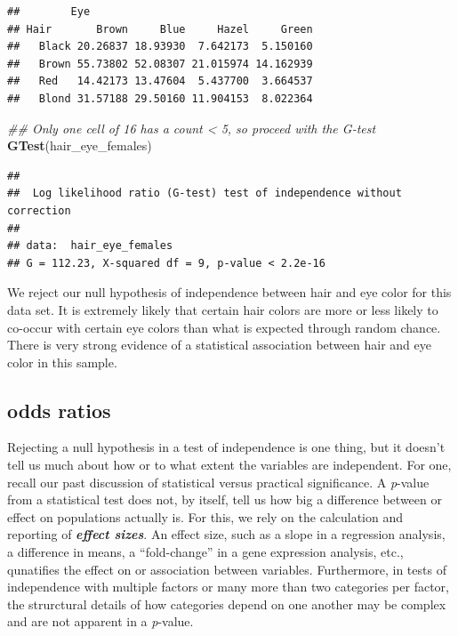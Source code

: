 \documentclass[]{book}
\newenvironment{Shaded}{\begin{snugshade}}{\end{snugshade}}
\newcommand{\CommentTok}[1]{\textcolor[rgb]{0.56,0.35,0.01}{\textit{#1}}}
\newcommand{\KeywordTok}[1]{\textcolor[rgb]{0.13,0.29,0.53}{\textbf{#1}}}
\newcommand{\NormalTok}[1]{#1}
\begin{document}
\begin{verbatim}
##        Eye
## Hair       Brown     Blue     Hazel     Green
##   Black 20.26837 18.93930  7.642173  5.150160
##   Brown 55.73802 52.08307 21.015974 14.162939
##   Red   14.42173 13.47604  5.437700  3.664537
##   Blond 31.57188 29.50160 11.904153  8.022364
\end{verbatim}

\begin{Shaded}
\begin{Highlighting}[]
\CommentTok{## Only one cell of 16 has a count < 5, so proceed with the G-test}
\KeywordTok{GTest}\NormalTok{(hair_eye_females)}
\end{Highlighting}
\end{Shaded}

\begin{verbatim}
## 
##  Log likelihood ratio (G-test) test of independence without correction
## 
## data:  hair_eye_females
## G = 112.23, X-squared df = 9, p-value < 2.2e-16
\end{verbatim}

We reject our null hypothesis of independence between hair and eye color for this data set. It is extremely likely that certain hair colors are more or less likely to co-occur with certain eye colors than what is expected through random chance. There is very strong evidence of a statistical association between hair and eye color in this sample.

\hypertarget{odds-ratios}{%
\subsection{odds ratios}\label{odds-ratios}}

Rejecting a null hypothesis in a test of independence is one thing, but it doesn't tell us much about how or to what extent the variables are independent. For one, recall our past discussion of statistical versus practical significance. A \emph{p}-value from a statistical test does not, by itself, tell us how big a difference between or effect on populations actually is. For this, we rely on the calculation and reporting of \textbf{\emph{effect sizes}}. An effect size, such as a slope in a regression analysis, a difference in means, a ``fold-change'' in a gene expression analysis, etc., qunatifies the effect on or association between variables. Furthermore, in tests of independence with multiple factors or many more than two categories per factor, the strurctural details of how categories depend on one another may be complex and are not apparent in a \emph{p}-value.
\end{document}
